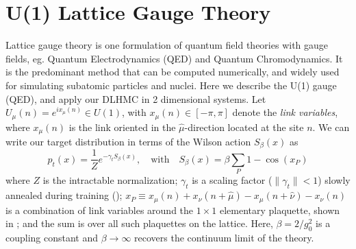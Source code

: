 \documentclass{article} %
\begin{document}
\section{\label{sec:lattice_gauge_theory}U(1) Lattice Gauge Theory}
%
Lattice gauge theory is one formulation of quantum field theories with gauge fields, eg. Quantum Electrodynamics (QED) and Quantum Chromodynamics.
It is the predominant method that can be computed numerically, and widely used for simulating subatomic particles and nuclei.
Here we describe the U(1) gauge (QED), and apply our DLHMC in 2 dimensional systems.
Let \(U_{\mu}(n) = e^{i x_{\mu}(n)} \in U(1)\), with \(x_{\mu}(n) \in [-\pi,\pi]\) denote the \emph{link
variables}, where \(x_{\mu}(n)\) is the link oriented in the \(\hat{\mu}\)-direction located at the site
\(n\).
%
We can write our target distribution in terms of the Wilson action \(S_{\beta}(x)\) as
%
\begin{equation}
   p_{t}(x) = \frac{1}{Z}e^{-\gamma_{t} S_{\beta}(x)},\quad\text{with}\quad S_{\beta}(x) = \beta \sum_{P}1 - \cos(x_{P})
   \label{eq:wilsonaction}
\end{equation}
%
where $Z$ is the intractable normalization;
\(\gamma_{t}\) is a scaling factor (\(\|\gamma_{t}\|<1\)) slowly annealed during training ();
\(x_{P} \equiv x_{\mu}(n) + x_{\nu}(n+\hat{\mu}) - x_{\mu}(n+\hat{\nu}) -x_{\nu}(n)\) is a combination of link
variables around the \(1\times1\) elementary plaquette, shown in ; and the sum is over all
such plaquettes on the lattice.
%
Here, \(\beta = 2 / g_{0}^{2}\) is a coupling constant and \(\beta\rightarrow\infty\) recovers the continuum limit of the theory. 
%
\end{document}
